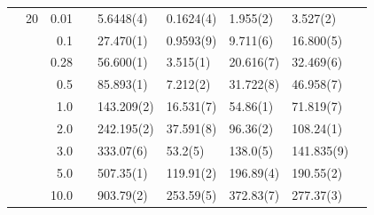 \begin{table}[H]
\begin{tabularx}{\textwidth}{R{1cm}rrcR{2.3cm}R{2.3cm}R{2.3cm}R{2.3cm}R{1cm}}
		&20 & 0.01 && 5.6448(4) & 0.1624(4) & 1.955(2) & 3.527(2) \\
		&& 0.1 && 27.470(1) & 0.9593(9) & 9.711(6) & 16.800(5) \\
		&& 0.28 && 56.600(1) & 3.515(1) & 20.616(7) & 32.469(6) \\
		&& 0.5 && 85.893(1) & 7.212(2) & 31.722(8) & 46.958(7) \\
		&& 1.0 && 143.209(2) & 16.531(7) & 54.86(1) & 71.819(7) \\
		&& 2.0 && 242.195(2) & 37.591(8) & 96.36(2) & 108.24(1) \\
		&& 3.0 && 333.07(6) & 53.2(5) & 138.0(5) & 141.835(9) \\ 
		&& 5.0 && 507.35(1) & 119.91(2) & 196.89(4) & 190.55(2) \\
		&& 10.0 && 903.79(2) & 253.59(5) & 372.83(7) & 277.37(3) \\
		\hline \hline
	\end{tabularx}
\end{table}

